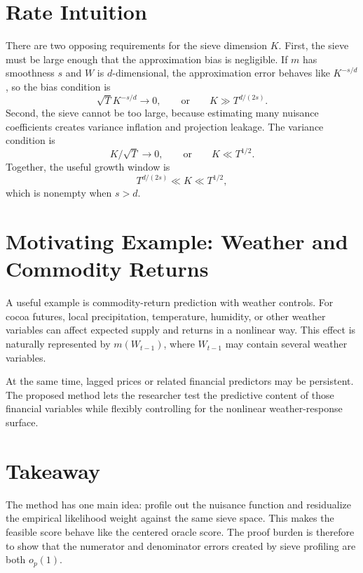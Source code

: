 \documentclass[11pt]{article}
\begin{document}
\section{Rate Intuition}

There are two opposing requirements for the sieve dimension \(K\). First, the sieve must be large enough that the approximation bias is negligible. If \(m\) has smoothness \(s\) and \(W\) is \(d\)-dimensional, the approximation error behaves like \(K^{-s/d}\), so the bias condition is
\[
    \sqrt T K^{-s/d}\to0,
    \qquad\text{or}\qquad
    K\gg T^{d/(2s)}.
\]
Second, the sieve cannot be too large, because estimating many nuisance coefficients creates variance inflation and projection leakage. The variance condition is
\[
    K/\sqrt T\to0,
    \qquad\text{or}\qquad
    K\ll T^{1/2}.
\]
Together, the useful growth window is
\begin{equation}
    T^{d/(2s)}\ll K\ll T^{1/2},
    \label{eq:expo-rate-window}
\end{equation}
which is nonempty when \(s>d\).

\section{Motivating Example: Weather and Commodity Returns}

A useful example is commodity-return prediction with weather controls. For cocoa futures, local precipitation, temperature, humidity, or other weather variables can affect expected supply and returns in a nonlinear way. This effect is naturally represented by \(m(W_{t-1})\), where \(W_{t-1}\) may contain several weather variables.

At the same time, lagged prices or related financial predictors may be persistent. The proposed method lets the researcher test the predictive content of those financial variables while flexibly controlling for the nonlinear weather-response surface.

\section{Takeaway}

The method has one main idea: profile out the nuisance function and residualize the empirical likelihood weight against the same sieve space. This makes the feasible score behave like the centered oracle score. The proof burden is therefore to show that the numerator and denominator errors created by sieve profiling are both \(o_p(1)\).
\end{document}
